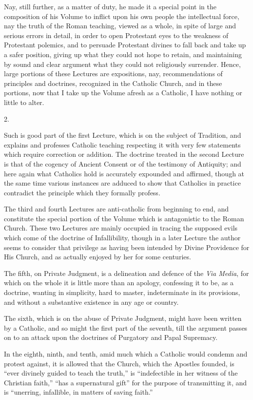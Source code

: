 Nay, still further, as a matter of duty, he made it a special point
in the composition of his Volume to inflict upon his own people the
intellectual force, nay the truth of the Roman teaching, viewed as a
whole, in spite of large and serious errors in detail, in order to
open Protestant eyes to the weakness of Protestant polemics, and to
persuade Protestant divines to fall back and take up a safer position,
giving up what they could not hope to retain, and maintaining by sound
and clear argument what they could not religiously surrender. Hence,
large portions of these Lectures are expositions, nay, recommendations
of principles and doctrines, recognized in the Catholic Church, and in
these portions, now that I take up the Volume afresh as a Catholic, I
have nothing or little to alter.

2.

Such is good part of the first Lecture, which is on the subject of
Tradition, and explains and professes Catholic teaching respecting it
with very few statements which require correction or addition.
The doctrine treated in the second Lecture is that of the cogency of
Ancient Consent or of the testimony of Antiquity; and here again what
Catholics hold is accurately expounded and affirmed, though at the
same time various instances are adduced to show that Catholics in
practice contradict the principle which they formally profess.

The third and fourth Lectures are anti-catholic from beginning to
end, and constitute the special portion of the Volume which is
antagonistic to the Roman Church. These two Lectures are mainly
occupied in tracing the supposed evils which come of the doctrine of
Infallibility, though in a later Lecture the author seems to consider
that privilege as having been intended by Divine Providence for His
Church, and as actually enjoyed by her for some centuries.

The fifth, on Private Judgment, is a delineation and defence of the
\emph{Via Media}, for which on the whole it is little more than an
apology, confessing it to be, as a doctrine, wanting in simplicity,
hard to master, indeterminate in its provisions, and without a
substantive existence in any age or country.

The sixth, which is on the abuse of Private Judgment, might have
been written by a Catholic, and so might the first part of the
seventh, till the argument passes on to an attack upon the doctrines
of Purgatory and Papal Supremacy.

In the eighth, ninth, and tenth, amid much which a Catholic would
condemn and protest against, it is allowed that the Church, which the
Apostles founded, is ``ever divinely guided to teach the
truth,'' is ``indefectible in her witness of the Christian
faith,'' ``has a supernatural gift'' for the purpose of
transmitting it, and is ``unerring, infallible, in matters of
saving faith.''

